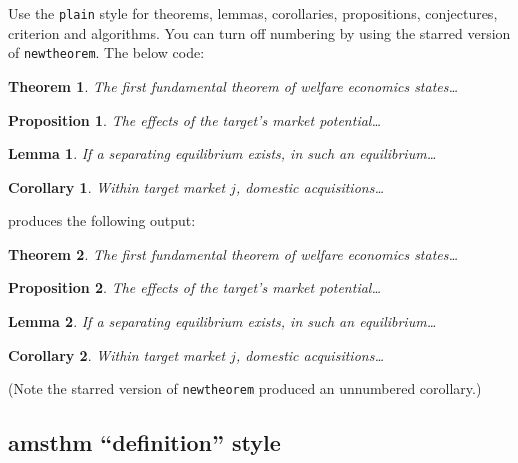 \documentclass{cje}          %
\theoremstyle{plain}%
\newtheorem{theorem}{Theorem}
\newtheorem{lemma}{Lemma}
\newtheorem{proposition}{Proposition}
\newtheorem*{corollary}{Corollary}
\theoremstyle{definition}
\theoremstyle{remark}
\begin{document}
Use the \verb"plain" style for theorems, lemmas, corollaries, propositions, conjectures, criterion and algorithms. You can turn off numbering by using the starred version of  \verb"newtheorem". The below code:
\begin{smallverbatim}
\theoremstyle{plain}%
  \newtheorem{theorem}{Theorem}
  \newtheorem{lemma}{Lemma}
  \newtheorem{proposition}{Proposition}
  \newtheorem*{corollary}{Corollary}
   
\begin{theorem}
  The first fundamental theorem of welfare economics states\ldots
\end{theorem}
\begin{proposition}
  The effects of the target's market potential\ldots
\end{proposition}
\begin{lemma}
\label{Lucas}
  If a separating equilibrium exists, in such an equilibrium\ldots
\end{lemma}
\begin{corollary}
  Within target market $j$, domestic acquisitions\ldots
\end{corollary}
\end{smallverbatim}
produces the following output:
\begin{theorem}
  The first fundamental theorem of welfare economics states\ldots
\end{theorem}
\begin{proposition}
  The effects of the target's market potential\ldots
\end{proposition}
\begin{lemma}
\label{Lucas}
  If a separating equilibrium exists, in such an equilibrium\ldots
\end{lemma}
\begin{corollary}
  Within target market $j$, domestic acquisitions\ldots
\end{corollary}
\noindent (Note the starred version of \verb"newtheorem" produced an unnumbered corollary.)

\subsection{amsthm ``definition'' style}
\label{amsdefn}
\end{document}
